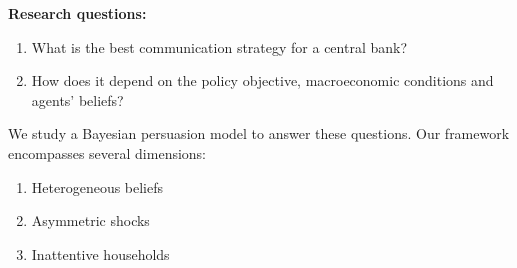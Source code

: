 \documentclass{beamer}
\begin{document}
\begin{frame}[allowframebreaks]
\begin{enumerate}
\end{enumerate}
\framebreak
\vskip10pt
\textbf{Research questions:}
\begin{enumerate}
    \item What is the best communication strategy for a central bank?
    \item How does it depend on the policy objective, macroeconomic conditions and agents' beliefs?
\end{enumerate}
\vskip10pt
We study a Bayesian persuasion \citep{KG2011} model to answer these questions. 
\vskip10pt
Our framework encompasses several dimensions:
    \begin{enumerate}
        \item Heterogeneous beliefs
        \item Asymmetric shocks
        \item Inattentive households
    \end{enumerate}
\end{frame}
\end{document}
